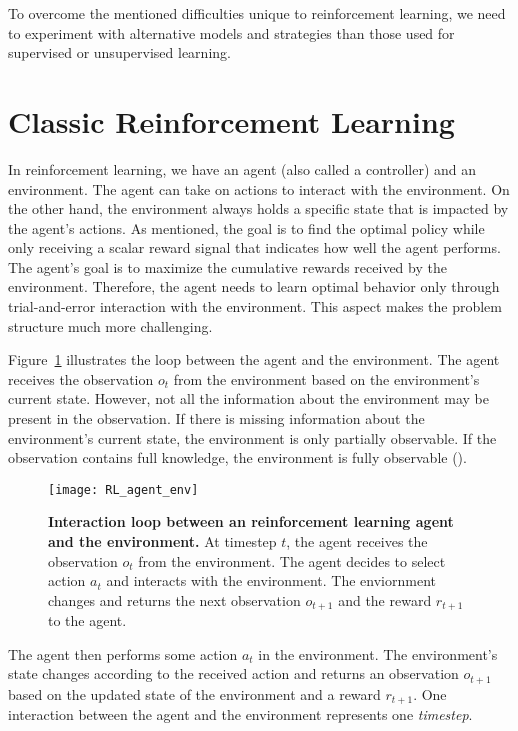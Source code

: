 To overcome the mentioned difficulties unique to reinforcement learning, we need to experiment with alternative models and strategies than those used for supervised or unsupervised learning.



\section{Classic Reinforcement Learning}
In reinforcement learning, we have an agent (also called a controller) and an environment. The agent can take on actions to interact with the environment. On the other hand, the environment always holds a specific state that is impacted by the agent's actions. As mentioned, the goal is to find the optimal policy while only receiving a scalar reward signal that indicates how well the agent performs. The agent's goal is to maximize the cumulative rewards received by the environment. Therefore, the agent needs to learn optimal behavior only through trial-and-error interaction with the environment. This aspect makes the problem structure much more challenging.

Figure~\ref{fig:RL_agent_env} illustrates the loop between the agent and the environment. The agent receives the observation $o_t$ from the environment based on the environment's current state. However, not all the information about the environment may be present in the observation. If there is missing information about the environment's current state, the environment is only partially observable. If the observation contains full knowledge, the environment is fully observable (\cite{dong2020deep}).
\begin{figure}[!ht]
\centering
\texttt{[image: RL\_agent\_env]}
\caption[Interaction loop between a reinforcement learning agent and the environment]{
  \textbf{Interaction loop between an reinforcement learning agent and the environment.}
  At timestep $t$, the agent receives the observation $o_t$ from the environment. The agent decides to select action $a_t$ and interacts with the environment. The enviornment changes and returns the next observation $o_{t+1}$ and the reward $r_{t+1}$ to the agent.
 }
\label{fig:RL_agent_env}
\end{figure}
The agent then performs some action $a_t$ in the environment. The environment's state changes according to the received action and returns an observation $o_{t+1}$ based on the updated state of the environment and a reward $r_{t+1}$. One interaction between the agent and the environment represents one \emph{timestep}.

